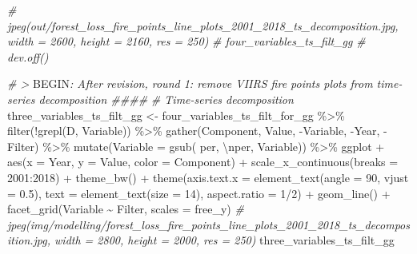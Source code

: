 \documentclass[10pt,landscape,a3paper]{article}
\newenvironment{Shaded}{\begin{snugshade}}{\end{snugshade}}
\newcommand{\AttributeTok}[1]{\textcolor[rgb]{0.77,0.63,0.00}{#1}}
\newcommand{\CommentTok}[1]{\textcolor[rgb]{0.56,0.35,0.01}{\textit{#1}}}
\newcommand{\DecValTok}[1]{\textcolor[rgb]{0.00,0.00,0.81}{#1}}
\newcommand{\FloatTok}[1]{\textcolor[rgb]{0.00,0.00,0.81}{#1}}
\newcommand{\FunctionTok}[1]{\textcolor[rgb]{0.00,0.00,0.00}{#1}}
\newcommand{\NormalTok}[1]{#1}
\newcommand{\OtherTok}[1]{\textcolor[rgb]{0.56,0.35,0.01}{#1}}
\newcommand{\RegionMarkerTok}[1]{#1}
\newcommand{\SpecialCharTok}[1]{\textcolor[rgb]{0.00,0.00,0.00}{#1}}
\newcommand{\StringTok}[1]{\textcolor[rgb]{0.31,0.60,0.02}{#1}}
\begin{document}
\begin{Shaded}
\begin{Highlighting}[]
\CommentTok{\# jpeg(\textquotesingle{}out/forest\_loss\_fire\_points\_line\_plots\_2001\_2018\_ts\_decomposition.jpg\textquotesingle{}, width = 2600, height = 2160, res = 250)}
\CommentTok{\# four\_variables\_ts\_filt\_gg}
\CommentTok{\# dev.off()}

\CommentTok{\# \textgreater{} }\RegionMarkerTok{BEGIN}\CommentTok{: After revision, round 1: remove VIIRS fire points plots from time{-}series decomposition \#\#\#\#}
\CommentTok{\# Time{-}series decomposition}
\NormalTok{three\_variables\_ts\_filt\_gg }\OtherTok{\textless{}{-}}\NormalTok{ four\_variables\_ts\_filt\_for\_gg }\SpecialCharTok{\%\textgreater{}\%}
  \FunctionTok{filter}\NormalTok{(}\SpecialCharTok{!}\FunctionTok{grepl}\NormalTok{(}\StringTok{\textquotesingle{}D\textquotesingle{}}\NormalTok{, Variable)) }\SpecialCharTok{\%\textgreater{}\%} 
  \FunctionTok{gather}\NormalTok{(Component, Value, }\SpecialCharTok{{-}}\NormalTok{Variable, }\SpecialCharTok{{-}}\NormalTok{Year, }\SpecialCharTok{{-}}\NormalTok{Filter) }\SpecialCharTok{\%\textgreater{}\%} 
  \FunctionTok{mutate}\NormalTok{(}\AttributeTok{Variable =} \FunctionTok{gsub}\NormalTok{(}\StringTok{\textquotesingle{} per\textquotesingle{}}\NormalTok{, }\StringTok{\textquotesingle{}}\SpecialCharTok{\textbackslash{}n}\StringTok{per\textquotesingle{}}\NormalTok{, Variable)) }\SpecialCharTok{\%\textgreater{}\%} 
\NormalTok{  ggplot }\SpecialCharTok{+}
  \FunctionTok{aes}\NormalTok{(}\AttributeTok{x =}\NormalTok{ Year, }\AttributeTok{y =}\NormalTok{ Value, }\AttributeTok{color =}\NormalTok{ Component) }\SpecialCharTok{+}
    \FunctionTok{scale\_x\_continuous}\NormalTok{(}\AttributeTok{breaks =} \DecValTok{2001}\SpecialCharTok{:}\DecValTok{2018}\NormalTok{) }\SpecialCharTok{+} 
  \FunctionTok{theme\_bw}\NormalTok{() }\SpecialCharTok{+}
  \FunctionTok{theme}\NormalTok{(}\AttributeTok{axis.text.x =} \FunctionTok{element\_text}\NormalTok{(}\AttributeTok{angle =} \DecValTok{90}\NormalTok{, }\AttributeTok{vjust =} \FloatTok{0.5}\NormalTok{), }\AttributeTok{text =} \FunctionTok{element\_text}\NormalTok{(}\AttributeTok{size =} \DecValTok{14}\NormalTok{), }\AttributeTok{aspect.ratio =} \DecValTok{1}\SpecialCharTok{/}\DecValTok{2}\NormalTok{) }\SpecialCharTok{+}
  \FunctionTok{geom\_line}\NormalTok{() }\SpecialCharTok{+}
  \FunctionTok{facet\_grid}\NormalTok{(Variable }\SpecialCharTok{\textasciitilde{}}\NormalTok{ Filter, }\AttributeTok{scales =} \StringTok{\textquotesingle{}free\_y\textquotesingle{}}\NormalTok{)}
\CommentTok{\# jpeg(\textquotesingle{}img/modelling/forest\_loss\_fire\_points\_line\_plots\_2001\_2018\_ts\_decomposition.jpg\textquotesingle{}, width = 2800, height = 2000, res = 250)}
\NormalTok{three\_variables\_ts\_filt\_gg}
\end{Highlighting}
\end{Shaded}
\end{document}
